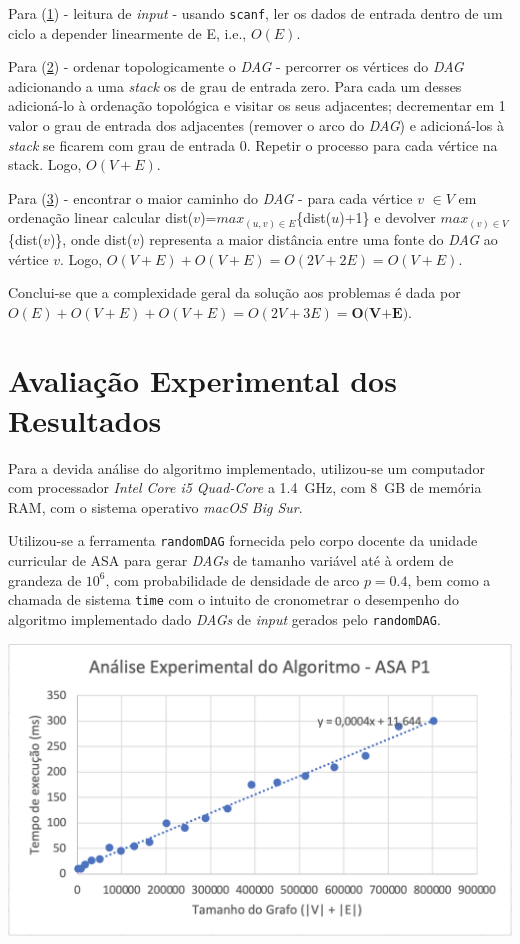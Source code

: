 \documentclass[12pt]{article}
\begin{document}
Para (\underline{1}) - leitura de \emph{input} - usando \texttt{scanf}, ler os dados de entrada dentro de um ciclo a depender linearmente de E, i.e., $O(E)$.

Para (\underline{2}) - ordenar topologicamente o \emph{DAG} - percorrer os vértices do \emph{DAG} adicionando a uma \emph{stack} os de grau de entrada zero. Para cada um desses adicioná-lo à ordenação topológica e visitar os seus adjacentes; decrementar em 1 valor o grau de entrada dos adjacentes (remover o arco do \emph{DAG}) e adicioná-los à \emph{stack} se ficarem com grau de entrada 0. Repetir o processo para cada vértice na stack. Logo, $O(V+E)$.

Para (\underline{3}) - encontrar o maior caminho do \emph{DAG} - para cada vértice $v$ $\in{V}$ em ordenação linear calcular dist($v$)=$max_{(u,v)\in{E}}$\{dist($u$)+1\} e devolver $max_{(v)\in{V}}$\{dist($v$)\}, onde dist($v$) representa a maior distância entre uma fonte do \emph{DAG} ao vértice $v$. Logo, $O(V+E)+O(V+E) = O(2V+2E) = O(V+E)$.

Conclui-se que a complexidade geral da solução aos problemas é dada por $O(E)+O(V+E)+O(V+E) = O(2V+3E) = \textbf{O(V+E)}$.

\section{Avaliação Experimental dos Resultados}
Para a devida análise do algoritmo implementado, utilizou-se um computador com processador \emph{Intel Core i5 Quad-Core} a \SI{1,4}{GHz}, com \SI{8}{GB} de memória RAM, com o sistema operativo \emph{macOS Big Sur}.

Utilizou-se a ferramenta \texttt{randomDAG} fornecida pelo corpo docente da unidade curricular de ASA para gerar \emph{DAGs} de tamanho variável até à ordem de grandeza de $10^6$, com probabilidade de densidade de arco $p=0.4$, bem como a chamada de sistema \texttt{time} com o intuito de cronometrar o desempenho do algoritmo implementado dado \emph{DAGs} de \emph{input} gerados pelo \texttt{randomDAG}.

\begin{center}
\includegraphics[width=\linewidth]{reglinear.png}
\end{center}	
\end{document}
